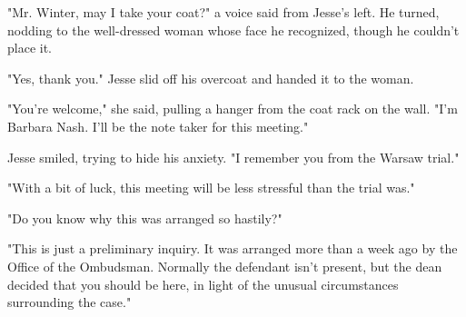 "Mr. Winter, may I take your coat?" a voice said from Jesse's left.  He turned, nodding to the well-dressed woman whose face he recognized, though he couldn't place it.

"Yes, thank you."  Jesse slid off his overcoat and handed it to the woman.

"You're welcome," she said, pulling a hanger from the coat rack on the wall.  "I'm Barbara Nash.  I'll be the note taker for this meeting."

Jesse smiled, trying to hide his anxiety.  "I remember you from the Warsaw trial."

"With a bit of luck, this meeting will be less stressful than the trial was."

"Do you know why this was arranged so hastily?"

"This is just a preliminary inquiry.  It was arranged more than a week ago by the Office of the Ombudsman.  Normally the defendant isn't present, but the dean decided that you should be here, in light of the unusual circumstances surrounding the case."